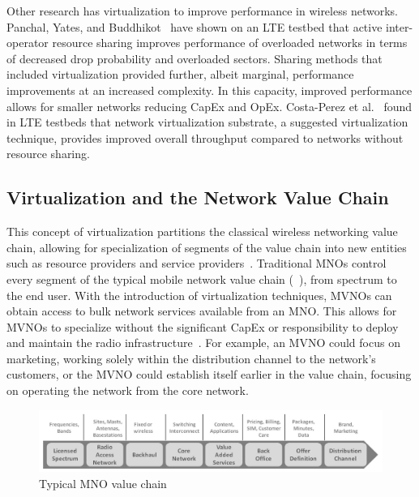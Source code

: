 \documentclass[12pt,dvipsnames]{report}
\begin{document}
Other research has virtualization to improve performance in wireless networks.  Panchal, Yates, and Buddhikot~\cite{6571315} have shown on an LTE testbed that active inter-operator resource sharing improves performance of overloaded networks in terms of decreased drop probability and overloaded sectors.  Sharing methods that included virtualization provided further, albeit marginal, performance improvements at an increased complexity.  In this capacity, improved performance allows for smaller networks reducing CapEx and OpEx.  Costa-Perez et al.~\cite{6553675} found in LTE testbeds that network virtualization substrate, a suggested virtualization technique, provides improved overall throughput compared to networks without resource sharing.

\subsection{Virtualization and the Network Value Chain} \label{subsec:virtualization_valuechain}

This concept of virtualization partitions the classical wireless networking value chain, allowing for specialization of segments of the value chain into new entities such as resource providers and service providers~\cite{1421931}.  Traditional MNOs control every segment of the typical mobile network value chain (~\cite{6737248}), from spectrum to the end user.  With the introduction of virtualization techniques, MVNOs can obtain access to bulk network services available from an MNO.  This allows for MVNOs to specialize without the significant CapEx or responsibility to deploy and maintain the radio infrastructure~\cite{6737248}.  For example, an MVNO could focus on marketing, working solely within the distribution channel to the network's customers, or the MVNO could establish itself earlier in the value chain, focusing on operating the network from the core network.

\begin{figure}[ht]
	\centering
	\includegraphics[width=1\linewidth]{ClassicNetworkValueChain}
	\caption[Typical MNO value chain]{Typical MNO value chain~\cite{6737248}}
	\label{fig:ClassicNetworkValueChain}
\end{figure}
\end{document}
